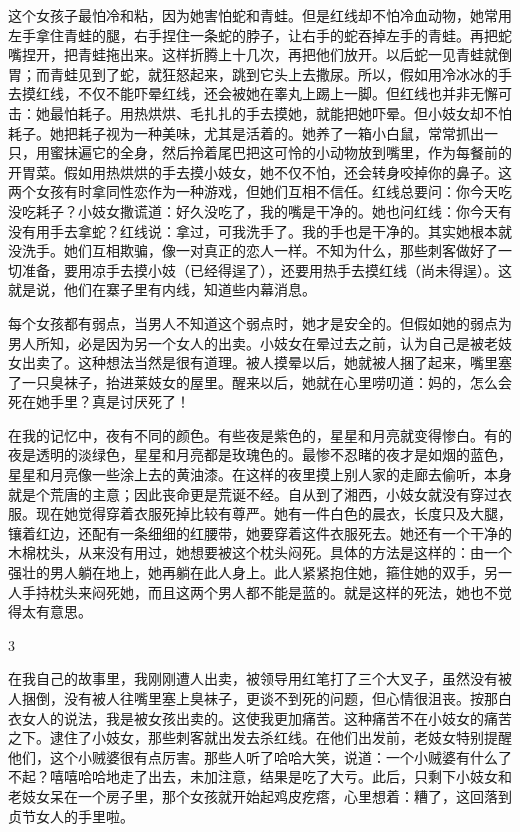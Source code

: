 这个女孩子最怕冷和粘，因为她害怕蛇和青蛙。但是红线却不怕冷血动物，她常用左手拿住青蛙的腿，右手捏住一条蛇的脖子，让右手的蛇吞掉左手的青蛙。再把蛇嘴捏开，把青蛙拖出来。这样折腾上十几次，再把他们放开。以后蛇一见青蛙就倒胃；而青蛙见到了蛇，就狂怒起来，跳到它头上去撒尿。所以，假如用冷冰冰的手去摸红线，不仅不能吓晕红线，还会被她在睾丸上踢上一脚。但红线也并非无懈可击：她最怕耗子。用热烘烘、毛扎扎的手去摸她，就能把她吓晕。但小妓女却不怕耗子。她把耗子视为一种美味，尤其是活着的。她养了一箱小白鼠，常常抓出一只，用蜜抹遍它的全身，然后拎着尾巴把这可怜的小动物放到嘴里，作为每餐前的开胃菜。假如用热烘烘的手去摸小妓女，她不仅不怕，还会转身咬掉你的鼻子。这两个女孩有时拿同性恋作为一种游戏，但她们互相不信任。红线总要问：你今天吃没吃耗子？小妓女撒谎道：好久没吃了，我的嘴是干净的。她也问红线：你今天有没有用手去拿蛇？红线说：拿过，可我洗手了。我的手也是干净的。其实她根本就没洗手。她们互相欺骗，像一对真正的恋人一样。不知为什么，那些刺客做好了一切准备，要用凉手去摸小妓（已经得逞了），还要用热手去摸红线（尚未得逞）。这就是说，他们在寨子里有内线，知道些内幕消息。 

每个女孩都有弱点，当男人不知道这个弱点时，她才是安全的。但假如她的弱点为男人所知，必是因为另一个女人的出卖。小妓女在晕过去之前，认为自己是被老妓女出卖了。这种想法当然是很有道理。被人摸晕以后，她就被人捆了起来，嘴里塞了一只臭袜子，抬进莱妓女的屋里。醒来以后，她就在心里唠叨道：妈的，怎么会死在她手里？真是讨厌死了！ 

在我的记忆中，夜有不同的颜色。有些夜是紫色的，星星和月亮就变得惨白。有的夜是透明的淡绿色，星星和月亮都是玫瑰色的。最惨不忍睹的夜才是如烟的蓝色，星星和月亮像一些涂上去的黄油漆。在这样的夜里摸上别人家的走廊去偷听，本身就是个荒唐的主意；因此丧命更是荒诞不经。自从到了湘西，小妓女就没有穿过衣服。现在她觉得穿着衣服死掉比较有尊严。她有一件白色的晨衣，长度只及大腿，镶着红边，还配有一条细细的红腰带，她要穿着这件衣服死去。她还有一个干净的木棉枕头，从来没有用过，她想要被这个枕头闷死。具体的方法是这样的：由一个强壮的男人躺在地上，她再躺在此人身上。此人紧紧抱住她，箍住她的双手，另一人手持枕头来闷死她，而且这两个男人都不能是蓝的。就是这样的死法，她也不觉得太有意思。 

3 

在我自己的故事里，我刚刚遭人出卖，被领导用红笔打了三个大叉子，虽然没有被人捆倒，没有被人往嘴里塞上臭袜子，更谈不到死的问题，但心情很沮丧。按那白衣女人的说法，我是被女孩出卖的。这使我更加痛苦。这种痛苦不在小妓女的痛苦之下。逮住了小妓女，那些刺客就出发去杀红线。在他们出发前，老妓女特别提醒他们，这个小贼婆很有点厉害。那些人听了哈哈大笑，说道：一个小贼婆有什么了不起？嘻嘻哈哈地走了出去，未加注意，结果是吃了大亏。此后，只剩下小妓女和老妓女呆在一个房子里，那个女孩就开始起鸡皮疙瘩，心里想着：糟了，这回落到贞节女人的手里啦。 

